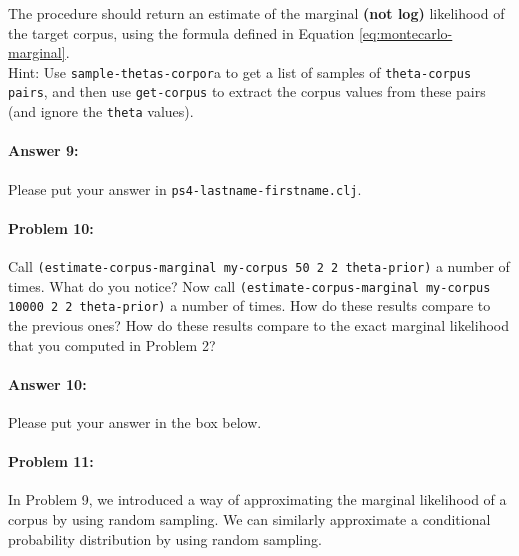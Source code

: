 \documentclass[10pt]{article}
\newenvironment{AnswerBox}{\begin{mdframed}[style=simple]}{\end{mdframed}}
\newcommand{\PSnum}{4}
\begin{document}
The procedure should return an estimate of the marginal
\textbf{(not log)} likelihood of the target corpus, using the formula
defined in Equation \ref{eq:montecarlo-marginal}.  \\

 Hint: Use \texttt{sample-thetas-corpor}a to get a list of
samples of \texttt{theta-corpus pairs}, and then use
\texttt{get-corpus} to extract the corpus values from these pairs (and
ignore the \texttt{theta} values).

\paragraph{Answer 9:} Please put your answer in
\texttt{ps\PSnum-lastname-firstname.clj}.

\hrulefill %

\paragraph{Problem 10:}

 Call \texttt{(estimate-corpus-marginal my-corpus 50 2 2
  theta-prior)} a number of times. What do you notice? Now call
\texttt{(estimate-corpus-marginal my-corpus 10000 2 2 theta-prior)} a
number of times. How do these results compare to the previous ones?
How do these results compare to the exact marginal
likelihood that you computed in Problem 2?

\paragraph{Answer 10:} Please put your answer in the box below.

\begin{AnswerBox}%

    
\end{AnswerBox}%
 

\hrulefill %

\paragraph{Problem 11:}
 In Problem 9, we introduced a way of approximating the
marginal likelihood of a corpus by using random sampling. We can
similarly approximate a conditional probability distribution by using
random sampling.  \\
\end{document}
